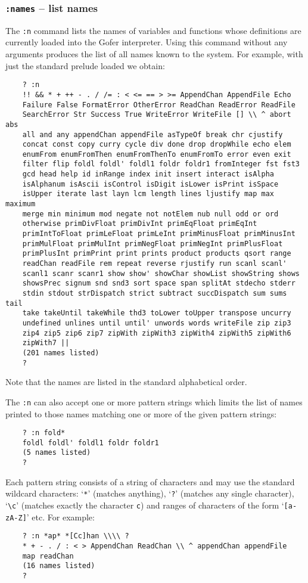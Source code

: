\subsubsection{{\tt :names} -- list names}
The \verb":n" command lists the names of variables and functions whose
definitions are currently loaded into the Gofer interpreter.  Using
this command without any arguments produces the list of all names
known to the system.  For example, with just the standard prelude
loaded we obtain:
\begin{verbatim}
    ? :n
    !! && * + ++ - . / /= : < <= == > >= AppendChan AppendFile Echo
    Failure False FormatError OtherError ReadChan ReadError ReadFile
    SearchError Str Success True WriteError WriteFile [] \\ ^ abort abs
    all and any appendChan appendFile asTypeOf break chr cjustify
    concat const copy curry cycle div done drop dropWhile echo elem
    enumFrom enumFromThen enumFromThenTo enumFromTo error even exit
    filter flip foldl foldl' foldl1 foldr foldr1 fromInteger fst fst3
    gcd head help id inRange index init insert interact isAlpha
    isAlphanum isAscii isControl isDigit isLower isPrint isSpace
    isUpper iterate last layn lcm length lines ljustify map max maximum
    merge min minimum mod negate not notElem nub null odd or ord
    otherwise primDivFloat primDivInt primEqFloat primEqInt
    primIntToFloat primLeFloat primLeInt primMinusFloat primMinusInt
    primMulFloat primMulInt primNegFloat primNegInt primPlusFloat
    primPlusInt primPrint print prints product products qsort range
    readChan readFile rem repeat reverse rjustify run scanl scanl'
    scanl1 scanr scanr1 show show' showChar showList showString shows
    showsPrec signum snd snd3 sort space span splitAt stdecho stderr
    stdin stdout strDispatch strict subtract succDispatch sum sums tail
    take takeUntil takeWhile thd3 toLower toUpper transpose uncurry
    undefined unlines until until' unwords words writeFile zip zip3
    zip4 zip5 zip6 zip7 zipWith zipWith3 zipWith4 zipWith5 zipWith6
    zipWith7 ||
    (201 names listed)
    ?
\end{verbatim}
Note that the names are listed in the standard alphabetical order.

The \verb":n" can also accept one or more pattern strings which limits the list
of names printed to those names matching one or more of the given
pattern strings:
\begin{verbatim}
    ? :n fold*
    foldl foldl' foldl1 foldr foldr1
    (5 names listed)
    ?
\end{verbatim}
Each pattern string consists of a string of characters and may use the
standard wildcard characters: `\verb"*"' (matches anything), `\verb"?"' 
(matches any
single character), `\verb"\c"' (matches exactly the character \verb"c") 
and ranges of
characters of the form `\verb"[a-zA-Z]"' etc.  For example:
\begin{verbatim}
    ? :n *ap* *[Cc]han \\\\ ?
    * + - . / : < > AppendChan ReadChan \\ ^ appendChan appendFile
    map readChan
    (16 names listed)
    ?
\end{verbatim}

